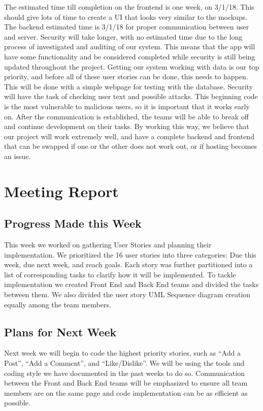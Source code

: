 \documentclass[12pt]{article}
\begin{document}
The estimated time till completion on the frontend is one week, on 3/1/18. This
should give lots of time to create a UI that looks very similar to the mockups.
The backend estimated time is 3/1/18 for proper communication between user and
server. Security will take longer, with no estimated time due to the long
process of investigated and auditing of our system. This means that the app will
have some functionality and be considered completed while security is still
being updated throughout the project. Getting our system working with data is
our top priority, and before all of these user stories can be done, this needs
to happen. This will be done with a simple webpage for testing with the
database. Security will have the task of checking user text and possible
attacks. This beginning code is the most vulnerable to malicious users, so it is
important that it works early on. After the communication is established, the
teams will be able to break off and continue development on their tasks. By
working this way, we believe that our project will work extremely well, and have
a complete backend and frontend that can be swapped if one or the other does not
work out, or if hosting becomes an issue.

\section{Meeting Report}

\subsection{Progress Made this Week}

This week we worked on gathering User Stories and planning their implementation.
We prioritized the 16 user stories into three categories: Due this week, due
next week, and reach goals. Each story was further partitioned into a list of
corresponding tasks to clarify how it will be implemented. To tackle
implementation we created Front End and Back End teams and divided the tasks
between them. We also divided the user story UML Sequence diagram creation
equally among the team members.

\subsection{Plans for Next Week}

Next week we will begin to code the highest priority stories, such as “Add a
Post”, “Add a Comment”, and “Like/Dislike”. We will be using the tools and
coding style we have documented in the past weeks to do so. Communication
between the Front and Back End teams will be emphasized to ensure all team
members are on the same page and code implementation can be as efficient as
possible.
\end{document}

